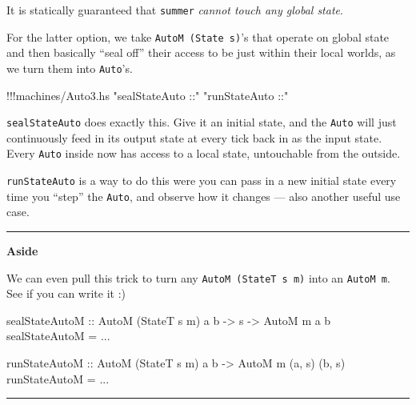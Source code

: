 \documentclass[]{article}
\newenvironment{Shaded}{}{}
\newcommand{\DataTypeTok}[1]{\textcolor[rgb]{0.56,0.13,0.00}{{#1}}}
\newcommand{\StringTok}[1]{\textcolor[rgb]{0.25,0.44,0.63}{{#1}}}
\newcommand{\OtherTok}[1]{\textcolor[rgb]{0.00,0.44,0.13}{{#1}}}
\newcommand{\FunctionTok}[1]{\textcolor[rgb]{0.02,0.16,0.49}{{#1}}}
\newcommand{\NormalTok}[1]{{#1}}
\begin{document}
It is statically guaranteed that \texttt{summer} \emph{cannot touch any
global state}.

For the latter option, we take \texttt{AutoM\ (State\ s)}'s that operate
on global state and then basically ``seal off'' their access to be just
within their local worlds, as we turn them into \texttt{Auto}'s.

\begin{Shaded}
\begin{Highlighting}[]
\FunctionTok{!!!}\NormalTok{machines}\FunctionTok{/}\NormalTok{Auto3.hs }\StringTok{"sealStateAuto ::"} \StringTok{"runStateAuto ::"}
\end{Highlighting}
\end{Shaded}

\texttt{sealStateAuto} does exactly this. Give it an initial state, and
the \texttt{Auto} will just continuously feed in its output state at
every tick back in as the input state. Every \texttt{Auto} inside now
has access to a local state, untouchable from the outside.

\texttt{runStateAuto} is a way to do this were you can pass in a new
initial state every time you ``step'' the \texttt{Auto}, and observe how
it changes --- also another useful use case.

\begin{center}\rule{0.5\linewidth}{\linethickness}\end{center}

\textbf{Aside}

We can even pull this trick to turn any \texttt{AutoM\ (StateT\ s\ m)}
into an \texttt{AutoM\ m}. See if you can write it :)

\begin{Shaded}
\begin{Highlighting}[]
\OtherTok{sealStateAutoM ::} \DataTypeTok{AutoM} \NormalTok{(}\DataTypeTok{StateT} \NormalTok{s m) a b }\OtherTok{->} \NormalTok{s }\OtherTok{->} \DataTypeTok{AutoM} \NormalTok{m a b}
\NormalTok{sealStateAutoM }\FunctionTok{=} \FunctionTok{...}

\OtherTok{runStateAutoM ::} \DataTypeTok{AutoM} \NormalTok{(}\DataTypeTok{StateT} \NormalTok{s m) a b }\OtherTok{->} \DataTypeTok{AutoM} \NormalTok{m (a, s) (b, s)}
\NormalTok{runStateAutoM }\FunctionTok{=} \FunctionTok{...}
\end{Highlighting}
\end{Shaded}

\begin{center}\rule{0.5\linewidth}{\linethickness}\end{center}
\end{document}
